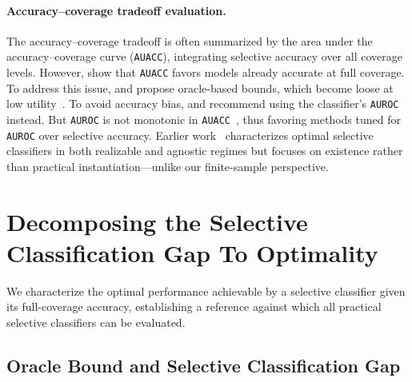 

\paragraph{Accuracy–coverage tradeoff evaluation.}
The accuracy–coverage tradeoff is often summarized by the area under the accuracy–coverage curve (\texttt{AUACC}), integrating selective accuracy over all coverage levels. However, \citet{geifman2018bias} show that \texttt{AUACC} favors models already accurate at full coverage. To address this issue, \citet{geifman2018bias} and \citet{rabanser2023training} propose oracle-based bounds, which become loose at low utility~\citep{galil2023can}. To avoid accuracy bias, \citet{galil2023can} and \citet{pugnana2023auc} recommend using the classifier’s \texttt{AUROC} instead. But \texttt{AUROC} is not monotonic in \texttt{AUACC}~\citep{cattelan2023fix, ding2020revisiting}, thus favoring methods tuned for \texttt{AUROC} over selective accuracy. Earlier work~\citep{el2010foundations, wiener2011agnostic} characterizes optimal selective classifiers in both realizable and agnostic regimes but focuses on existence rather than practical instantiation—unlike our finite-sample perspective.



\section{Decomposing the Selective Classification Gap To Optimality}
\label{sec:methods}

We characterize the optimal performance achievable by a selective classifier given its full-coverage accuracy, establishing a reference against which all practical selective classifiers can be evaluated.


\subsection{Oracle Bound and Selective Classification Gap}

